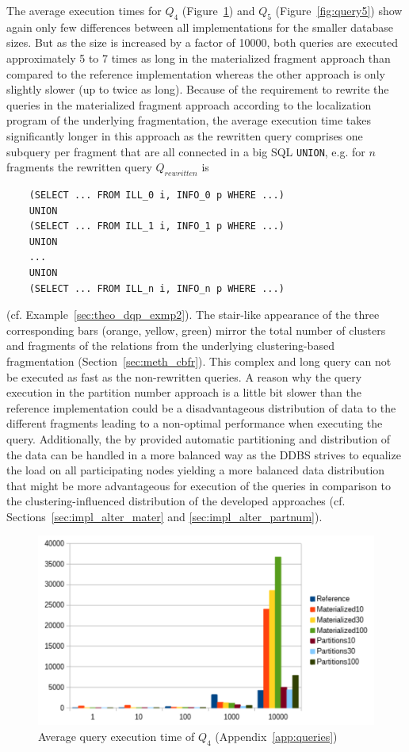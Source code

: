 The average execution times for $Q_4$ (Figure~\ref{fig:query4}) and $Q_5$ (Figure~\ref{fig:query5}) show again only few differences between all 
implementations for the smaller database sizes. But as the size is increased by a factor of 10000, both queries are executed approximately 5 to 7 times as long 
in the materialized fragment approach than compared to the reference implementation whereas the other approach is only slightly slower (up to twice as long).
Because of the requirement to rewrite the queries in the materialized fragment approach according to the localization program of the underlying fragmentation,
the average execution time takes significantly longer in this approach as the rewritten query comprises one subquery per fragment that are all connected in a 
big SQL \verb!UNION!, e.g. for $n$ fragments the rewritten query $Q_{rewritten}$ is
\begin{verbatim}
    (SELECT ... FROM ILL_0 i, INFO_0 p WHERE ...)
    UNION
    (SELECT ... FROM ILL_1 i, INFO_1 p WHERE ...)
    UNION
    ...
    UNION
    (SELECT ... FROM ILL_n i, INFO_n p WHERE ...)
\end{verbatim}
(cf. Example~\ref{sec:theo_dqp_exmp2}). The stair-like appearance of the three corresponding bars (orange, yellow, green) mirror the total number of clusters 
and fragments of the relations from the underlying clustering-based fragmentation (Section~\ref{sec:meth_cbfr}). This complex and long query can not be executed
as fast as the non-rewritten queries. A reason why the query execution in the partition number approach is a little bit slower than the reference implementation
could be a disadvantageous distribution of data to the different fragments leading to a non-optimal performance when executing the query. Additionally, the by
 provided automatic partitioning and distribution of the data can be handled in a more balanced way as the DDBS strives to equalize the load 
on all participating nodes yielding a more balanced data distribution that might be more advantageous for execution of the queries in comparison to the
clustering-influenced distribution of the developed approaches (cf. Sections~\ref{sec:impl_alter_mater} and \ref{sec:impl_alter_partnum}).
\begin{figure}[h]
    \centering
    \includegraphics[scale=0.8]{charts/Query4.pdf}
    \caption{Average query execution time of $Q_4$ (Appendix~\ref{app:queries})}
    \label{fig:query4}
\end{figure}


